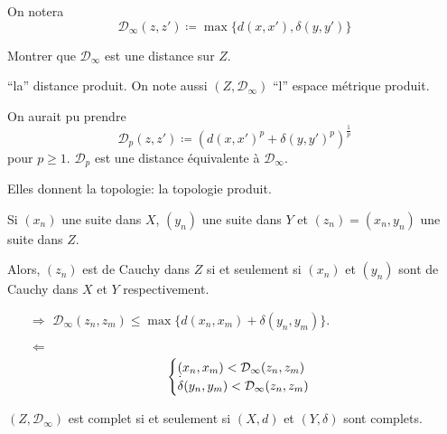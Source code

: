 \documentclass[french,a4paper,10pt]{article}
\begin{document}
    \begin{notation}
        On notera
        \[
            \mathcal D_\infty(z,z')\coloneqq \max\{d(x,x'),\delta(y,y')\}
        \]

        \begin{exercise}
            Montrer que $\mathcal D_\infty$ est une distance sur $Z$.
        \end{exercise}

        ``la'' distance produit. 
        On note aussi $(Z, \mathcal D_\infty)$ ``l'' espace métrique produit.

         On aurait pu prendre
        \[
            \mathcal D_p(z,z')\coloneqq {\left({d(x,x')}^p+{\delta(y,y')}^p\right)}^{\frac1p}
        \]
        pour $p\geq 1$. $\mathcal D_p$ est une distance équivalente à $\mathcal D_\infty$.

        Elles donnent la  topologie: la topologie produit.
    \end{notation}

    \begin{proposition}
        Si $(x_n)$ une suite dans $X$,  $(y_n)$ une suite dans $Y$ et $(z_n) = (x_n,y_n)$ une suite dans $Z$.

        Alors, $(z_n)$ est de Cauchy dans $Z$ si et seulement si $(x_n)$ et $(y_n)$ sont de Cauchy dans $X$ et $Y$ respectivement.
    \end{proposition}

    \begin{myproof}
        \begin{itemize}
            \item[$\Rightarrow$] $\mathcal D_\infty(z_n,z_m) \le \max\{d(x_n,x_m)+\delta(y_n,y_m)\}$.

            \item[$\Leftarrow$] 
            \[\begin{cases}
                \d(x_n,x_m)<\mathcal D_\infty(z_n,z_m)\\
                \delta(y_n,y_m)<\mathcal D_\infty(z_n,z_m)
            \end{cases}\]
        \end{itemize}
    \end{myproof}

    \begin{corollaire}
        $(Z, \mathcal D_\infty)$ est complet si et seulement si $(X,d)$ et $(Y,\delta)$ sont complets.
    \end{corollaire}
\end{document}
